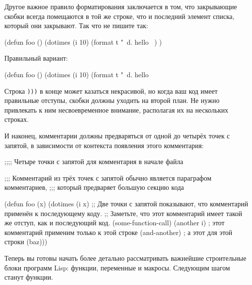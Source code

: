 Другое важное правило форматирования заключается в том, что закрывающие скобки всегда
помещаются в той же строке, что и последний элемент списка, который они закрывают. Так что
не пишите так:

\begin{myverb}
  (defun foo ()
    (dotimes (i 10)
      (format t "~d. hello~%
    )
  )
\end{myverb}

\noindent{}Правильный вариант:

\begin{myverb}
  (defun foo ()
    (dotimes (i 10)
      (format t "~d. hello~%
\end{myverb}

Строка \lstinline{)))} в конце может казаться некрасивой, но когда ваш код имеет правильные
отступы, скобки должны уходить на второй план. Не нужно привлекать к ним несвоевременное
внимание, располагая их на нескольких строках.

И наконец, комментарии должны предваряться от одной до четырёх точек с запятой, в
зависимости от контекста появления этого комментария:

\begin{myverb}
  ;;;; Четыре точки с запятой для комментария в начале файла

  ;;; Комментарий из трёх точек с запятой обычно является параграфом комментариев,
  ;;; который предваряет большую секцию кода

  (defun foo (x)
    (dotimes (i x)
      ;; Две точки с запятой показывают, что комментарий применён к последующему коду.
      ;; Заметьте, что этот комментарий имеет такой же отступ, как и последующий код.
      (some-function-call)
      (another i)              ; этот комментарий применим только к этой строке
      (and-another)            ; а этот для этой строки
      (baz)))
\end{myverb}

Теперь вы готовы начать более детально рассматривать важнейшие строительные блоки программ
Lisp: функции, переменные и макросы. Следующим шагом станут функции.

